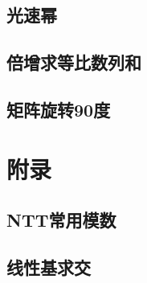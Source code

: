 \documentclass[a4paper,twocolumn]{article}
\begin{document}
\subsection{光速幂}

\subsection{倍增求等比数列和}

\subsection{矩阵旋转90度}

\section{附录}
\subsection{NTT常用模数}
\begin{spacing}{1.5}

\end{spacing}
\subsection{线性基求交}

\end{document}
